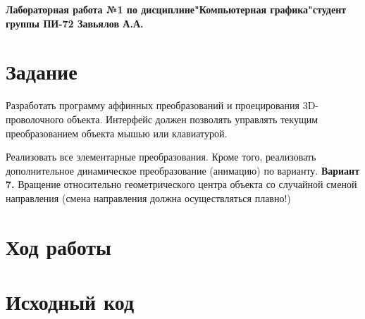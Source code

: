 \documentclass[a4paper,12pt]{article}
\begin{document}

\begin{center}
  \textbf{Лабораторная работа №1 по дисциплине\linebreak"Компьютерная графика"\linebreak{} студент группы ПИ-72 Завьялов А.А.}\\
\end{center}

\section{\normalsize{Задание}}
\begin{flushleft}
  Разработать программу аффинных преобразований и проецирования 3D-проволочного объекта. Интерфейс должен позволять управлять текущим преобразованием объекта мышью или клавиатурой.
\end{flushleft}

\begin{flushleft}
  Реализовать все элементарные преобразования. Кроме того, реализовать дополнительное динамическое преобразование (анимацию) по варианту.
  \linebreak\linebreak
  \textbf{Вариант 7.} Вращение относительно геометрического центра объекта со случайной сменой направления (смена направления должна осуществляться плавно!)
\end{flushleft}

\section{\normalsize{Ход работы}}
\begin{flushleft}
  
\end{flushleft}

\section{\normalsize{Исходный код}}
\end{document}
